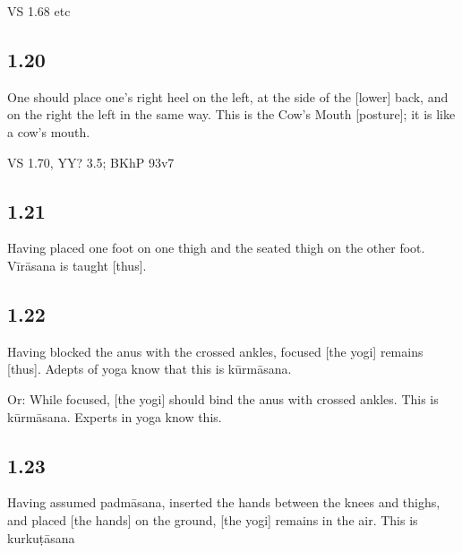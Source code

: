 \begin{ekdosis}
\begin{sources}[hp01_019]
VS 1.68 etc
\end{sources}


\subsection*{1.20}
\begin{translation}[hp01_020]
One should place one's right heel on the left, at the side of the [lower] back, and on the right the left in the same way. This is the Cow's Mouth [posture]; it is like a cow's mouth.
\end{translation}

\begin{sources}[hp01_020]
VS 1.70, YY? 3.5; BKhP 93v7
\end{sources}


\subsection*{1.21}
\begin{translation}[hp01_021]
Having placed one foot on one thigh and the seated thigh on the other foot. Vīrāsana is taught [thus]. 
\end{translation}

\subsection*{1.22}
\begin{translation}[hp01_022]
Having blocked the anus with the crossed ankles, focused [the yogi] remains [thus]. Adepts of yoga know that this is kūrmāsana.

Or: While focused, [the yogi] should bind the anus with crossed ankles. This is kūrmāsana. Experts in yoga know this.
\end{translation}

\subsection*{1.23}
\begin{translation}[hp01_023]
Having assumed padmāsana, inserted the hands between the knees and thighs, and placed [the hands] on the ground, [the yogi] remains in the air. This is kurkuṭāsana


\end{translation}
\end{ekdosis}
